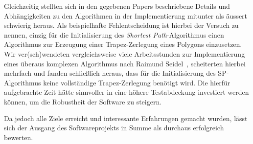     Gleichzeitig stellten sich in den gegebenen Papers beschriebene Details und
    Abhängigkeiten zu den Algorithmen in der Implementierung mitunter als
    äussert schwierig heraus. Als beispielhafte Fehlentscheidung ist hierbei der
    Versuch zu nennen, einzig für die Initialisierung des \emph{Shortest
    Path}-Algorithmus einen Algorithmus zur Erzeugung einer Trapez-Zerlegung
    eines Polygons einzusetzen. Wir ver(sch)wendeten vergleichsweise viele
    Arbeitsstunden zur Implementierung eines überaus komplexen Algorithmus nach
    Raimund Seidel~\cite{seidel91asimple}, scheiterten hierbei mehrfach und
    fanden schließlich heraus, dass für die Initialisierung des SP-Algorithmus
    keine vollständige Trapez-Zerlegung benötigt wird. Die hierfür aufgebrachte
    Zeit hätte sinnvoller in eine höhere Testabdeckung investiert werden können,
    um die Robustheit der Software zu steigern.

    Da jedoch alle Ziele erreicht und interessante Erfahrungen gemacht wurden,
    lässt sich der Ausgang des Softwareprojekts in Summe als durchaus
    erfolgreich bewerten.


